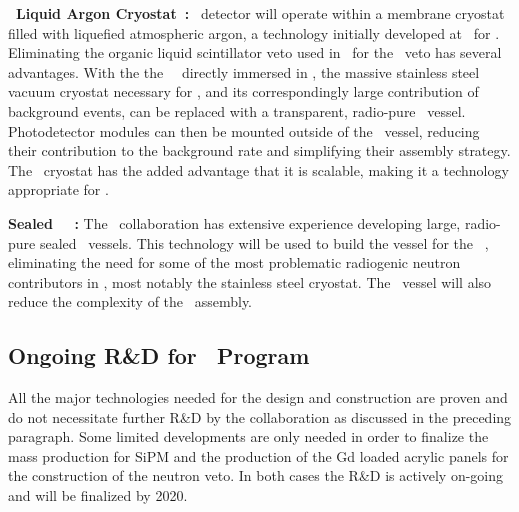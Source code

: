 {\bf \pDUNE\ Liquid Argon Cryostat~\cite{Abi:2017wp,Acciarri:2016wz}:}
\DSks\ detector will operate within a membrane cryostat filled with liquefied atmospheric argon, a technology initially developed at \CERN\ for \pDUNE. Eliminating the organic liquid scintillator veto used in \DSfs\ for the \AAr\ veto has several advantages. With the the \DSks\ \LArTPC\ directly immersed in \AAr, the massive stainless steel vacuum cryostat necessary for \DSfs, and its correspondingly large contribution of background events, can be replaced with a transparent, radio-pure \PMMA\ vessel. Photodetector modules can then be mounted outside of the \PMMA\ vessel, reducing their contribution to the background rate and simplifying their assembly strategy. The \pDUNE\ cryostat has the added advantage that it is scalable, making it a technology appropriate for \Argo.

{\bf Sealed \PMMA\ \TPC~\cite{Boulay:2012er,Nantais:2013jp,Amaudruz:2018gr}:}
The \DEAP\ collaboration has extensive experience developing large, radio-pure sealed \PMMA\ vessels. This technology will be used to build the vessel for the \DSks\ \LArTPC, eliminating the need for some of the most problematic radiogenic neutron contributors in \DSfs, most notably the stainless steel cryostat. The \PMMA\ vessel will also reduce the complexity of the \TPC\ assembly.

\subsection{Ongoing R\&D for \DSks\ Program}
\label{sec:OngoingRandD}

All the major technologies needed for the design and construction are proven and do not necessitate further R\&D by the collaboration as discussed in the preceding paragraph. Some limited developments are only needed in order to finalize the mass production for SiPM and the production of the Gd loaded acrylic panels for the construction of the neutron veto. In both cases the R\&D is actively on-going and will be finalized by 2020. 






